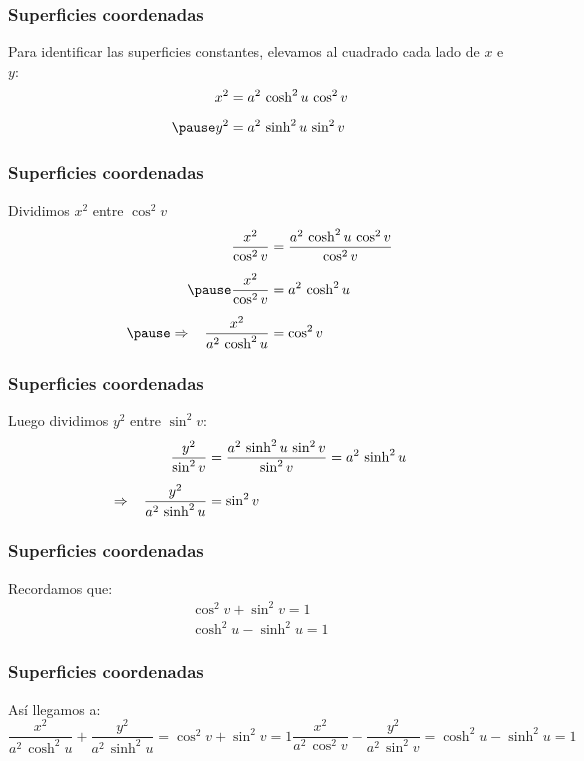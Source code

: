\documentclass[12pt]{beamer}
\begin{document}
\begin{frame}
\frametitle{Superficies coordenadas}
Para identificar las superficies constantes, elevamos al cuadrado cada lado de $x$ e $y$:
\pause
\begin{eqnarray*}
\begin{aligned}
x^{2} &= a^{2} \, \cosh^{2} u \, \cos^{2} v \label{eq:ecuacion_02_74_esp} \\[0.5em] \pause
y^{2} &= a^{2} \, \sinh^{2} u \, \sin^{2} v \label{eq:ecuacion_02_75_esp}
\end{aligned}
\end{eqnarray*}
\end{frame}
\begin{frame}
\frametitle{Superficies coordenadas}
Dividimos $x^{2}$ entre $\cos^{2} v$ \pause
\begin{eqnarray*}
\begin{aligned}
\dfrac{x^{2}}{\cos^{2} v} &= \dfrac{a^{2} \, \cosh^{2} u \, \cos^{2} v}{\cos^{2} v} \\[0.5em] \pause
\dfrac{x^{2}}{\cos^{2} v} &= a^{2} \, \cosh^{2} u \\[0.5em] \pause
\Rightarrow \hspace{0.3cm} \dfrac{x^{2}}{a^{2} \, \cosh^{2} u} &= \cos^{2} v 
\end{aligned}
\end{eqnarray*}
\end{frame}
\begin{frame}
\frametitle{Superficies coordenadas}
Luego dividimos $y^{2}$ entre $\sin^{2} v$:
\pause
\begin{eqnarray*}
\begin{aligned}
\dfrac{y^{2}}{\sin^{2} v} &= \dfrac{a^{2} \, \sinh^{2} u \, \sin^{2} v}{\sin^{2} v} = a^{2} \, \sinh^{2} u  \\[0.5em]
\Rightarrow \hspace{0.3cm} \dfrac{y^{2}}{a^{2} \, \sinh^{2} u} &= \sin^{2} v
\end{aligned}
\end{eqnarray*}
\end{frame}
\begin{frame}
\frametitle{Superficies coordenadas}
Recordamos que:
\pause
\begin{align*}
\cos^{2} v + \sin^{2} v = 1 \\[0.5em]
\cosh^{2} u - \sinh^{2} u = 1
\end{align*}
\end{frame}
\begin{frame}
\frametitle{Superficies coordenadas}
Así llegamos a:
\pause
\begin{subequations}
\begin{equation}
\dfrac{x^{2}}{a^{2} \, \cosh^{2} u} + \dfrac{y^{2}}{a^{2} \, \sinh^{2} u} = \cos^{2} v + \sin^{2} v = 1 \label{eq:ecuacion_02_76_esp}
\end{equation}
\begin{equation}
\dfrac{x^{2}}{a^{2} \, \cos^{2} v} - \dfrac{y^{2}}{a^{2} \, \sin^{2} v } = \cosh^{2} u - \sinh^{2} u = 1 \label{eq:ecuacion_02_77_esp}
\end{equation}
\end{subequations}
\end{frame}
\end{document}

